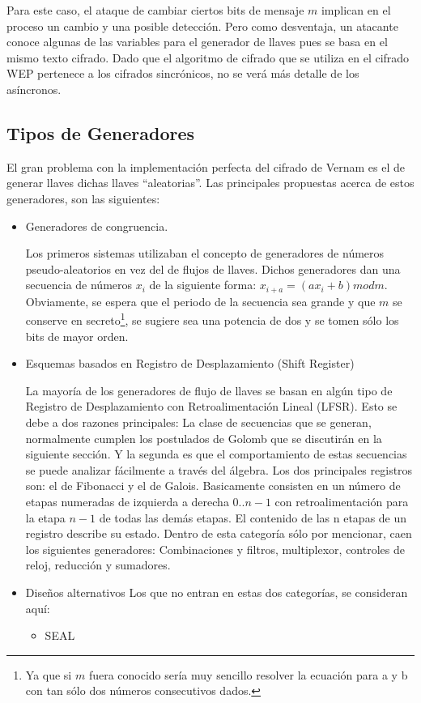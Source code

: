 Para este caso, el ataque de cambiar ciertos bits de mensaje $m$ implican en el proceso un cambio y una posible detección. Pero como desventaja, un atacante conoce algunas de las variables para el generador de llaves pues se basa en el mismo texto cifrado. Dado que el algoritmo de cifrado que se utiliza en el cifrado WEP pertenece a los cifrados sincrónicos, no se verá más detalle de los asíncronos.
\subsection{Tipos de Generadores}
El gran problema con la implementación perfecta del cifrado de Vernam es el de generar llaves dichas llaves ``aleatorias''. Las principales propuestas acerca de estos generadores, son las siguientes:
\begin{itemize}
	\item Generadores de congruencia.
	
	Los primeros sistemas utilizaban el concepto de generadores de números pseudo-aleatorios en vez del de flujos de llaves. Dichos generadores dan una secuencia de números $x_i$ de la siguiente forma:
	$x_{i+a} = (ax_i +b) mod m$.
	Obviamente, se espera que el periodo de la secuencia sea grande y que $m$ se conserve en secreto\footnote{Ya que si $m$ fuera conocido sería muy sencillo resolver la ecuación para a y b con tan sólo dos números consecutivos dados.}, se sugiere sea una potencia de dos y se tomen sólo los bits de mayor orden. 
	\item Esquemas basados en Registro de Desplazamiento (Shift Register)
	
	La mayoría de los generadores de flujo de llaves se basan en algún tipo de Registro de Desplazamiento con Retroalimentación Lineal (LFSR). Esto se debe a dos razones principales: La clase de secuencias que se generan, normalmente cumplen los postulados de Golomb que se discutirán en la siguiente sección. Y la segunda es que el comportamiento de estas secuencias se puede analizar fácilmente a través del álgebra.
	Los dos principales registros son: el de Fibonacci y el de Galois. Basicamente consisten en un número de etapas numeradas de izquierda a derecha $0..n-1$ con retroalimentación para la etapa $n-1$ de todas las demás etapas. El contenido de las n etapas  de un registro describe su estado.
	Dentro de esta categoría sólo por mencionar, caen los siguientes generadores:
	Combinaciones y filtros, multiplexor, controles de reloj, reducción y sumadores.
	\item Diseños alternativos
	Los que no entran en estas dos categorías, se consideran aquí:
		\begin{itemize}
			\item SEAL
			

\end{itemize}
\end{itemize}
